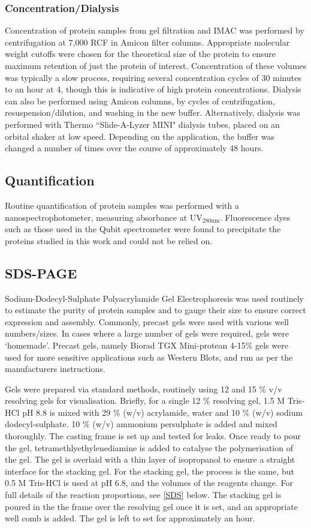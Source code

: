 \subsubsection{Concentration/Dialysis}
Concentration of protein samples from gel filtration and IMAC was performed by centrifugation at 7,000 RCF in Amicon filter columns. Appropriate molecular weight cutoffs were chosen for the theoretical size of the protein to ensure maximum retention of just the protein of interest. Concentration of these volumes was typically a slow process, requiring several concentration cycles of 30 minutes to an hour at 4\degC, though this is indicative of high protein concentrations. Dialysis can also be performed using Amicon columns, by cycles of centrifugation, resuspension/dilution, and washing in the new buffer. Alternatively, dialysis was performed with Thermo ``Slide-A-Lyzer MINI" dialysis tubes, placed on an orbital shaker at low speed. Depending on the application, the buffer was changed a number of times over the course of approximately 48 hours.

\subsection{Quantification}
Routine quantification of protein samples was performed with a nanospectrophotometer, measuring absorbance at UV$_{\mathrm{280nm}}$. Fluorescence dyes such as those used in the Qubit spectrometer were found to precipitate the proteins studied in this work and could not be relied on.

\subsection{SDS-PAGE}
	Sodium-Dodecyl-Sulphate Polyacrylamide Gel Electrophoresis was used routinely to estimate the purity of protein samples and to gauge their size to ensure correct expression and assembly. Commonly, precast gels were used with various well numbers/sizes. In cases where a large number of gels were required, gels were `homemade'. Precast gels, namely Biorad TGX Mini-protean 4-15\% gels were used for more sensitive applications such as Western Blots, and run as per the manufacturers instructions.

Gels were prepared via standard methods, routinely using 12 and 15 \% v/v resolving gels for visualisation. Briefly, for a single 12 \% resolving gel, 1.5 M Tris-HCl pH 8.8 is mixed with 29 \% (w/v) acrylamide, water and 10 \% (w/v) sodium dodecyl-sulphate. 10 \% (w/v) ammonium persulphate is added and mixed thoroughly. The casting frame is set up and tested for leaks. Once ready to pour the gel, tetramethlyethylenediamine is added to catalyse the polymerisation of the gel. The gel is overlaid with a thin layer of isopropanol to ensure a straight interface for the stacking gel. For the stacking gel, the process is the same, but 0.5 M Tris-HCl is used at pH 6.8, and the volumes of the reagents change. For full details of the reaction proportions, see \vref{SDS} below. The stacking gel is poured in the the frame over the resolving gel once it is set, and an appropriate well comb is added. The gel is left to set for approximately an hour.


